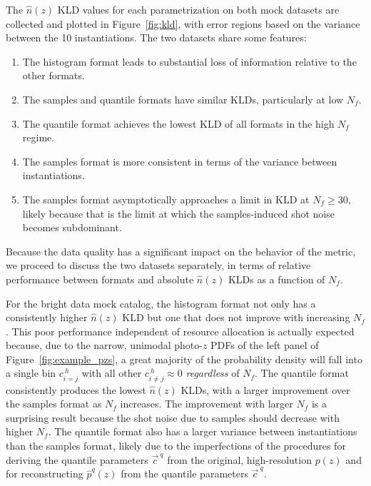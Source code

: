 \documentclass[\docopts]{\docclass}
\newcommand{\pz}{photo-$z$ PDF}
\newcommand{\mgdata}{bright\xspace}
\begin{document}
The $\hat{n}(z)$ KLD values for each parametrization on both mock datasets are 
collected and plotted in Figure~\ref{fig:kld}, with error regions based on the 
variance between the 10 instantiations.
The two datasets share some features:
\begin{enumerate}
\item The histogram format leads to substantial loss of information relative to 
the other formats.
\item The samples and quantile formats have similar KLDs, particularly at low 
$N_{f}$.
\item The quantile format achieves the lowest KLD of all formats in the high 
$N_{f}$ regime.
\item The samples format is more consistent in terms of the variance between 
instantiations.
\item The samples format asymptotically approaches a limit in KLD at 
$N_{f}\geq30$, likely because that is the limit at which the samples-induced 
shot noise becomes subdominant.
\end{enumerate}
Because the data quality has a significant impact on the behavior of the 
metric, we proceed to discuss the two datasets separately, in terms of relative 
performance between formats and absolute $\hat{n}(z)$ KLDs as a function of 
$N_{f}$.


For the \mgdata data mock catalog, the histogram format not only has a 
consistently higher $\hat{n}(z)$ KLD but one that does not improve with 
increasing $N_{f}$.
This poor performance independent of resource allocation is actually expected 
because, due to the narrow, unimodal \pz s of the left panel of 
Figure~\ref{fig:example_pzs}, a great majority of the probability density will 
fall into a single bin $c^{\ h}_{i=j}$ with all other $c^{\ h}_{i\neq j}\approx 
0$ \textit{regardless} of $N_{f}$.
The quantile format consistently produces the lowest $\hat{n}(z)$ KLDs, with a 
larger improvement over the samples format as $N_{f}$ increases.
The improvement with larger $N_{f}$ is a surprising result because the shot 
noise due to samples should decrease with higher $N_{f}$.
The quantile format also has a larger variance between instantiations than the 
samples format, likely due to the imperfections of the procedures for deriving 
the quantile parameters $\vec{c}^{\ q}$ from the original, high-resolution 
$p(z)$ and for reconstructing $\hat{p}^{q}(z)$ from the quantile parameters 
$\vec{c}^{\ q}$.
\end{document}
